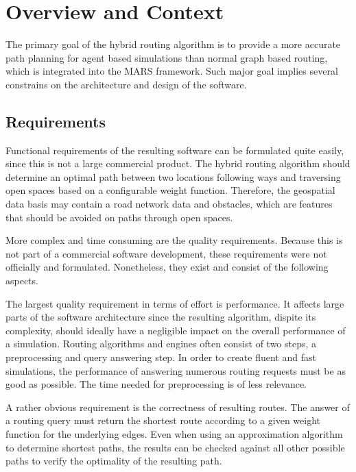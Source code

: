 
\section{Overview and Context}

	The primary goal of the hybrid routing algorithm is to provide a more accurate path planning for agent based simulations than normal graph based routing, which is integrated into the MARS framework.
	Such major goal implies several constrains on the architecture and design of the software.
	
	\subsection{Requirements}
	
		Functional requirements of the resulting software can be formulated quite easily, since this is not a large commercial product.
		The hybrid routing algorithm should determine an optimal path between two locations following ways and traversing open spaces based on a configurable weight function.
		Therefore, the geospatial data basis may contain a road network data and obstacles, which are features that should be avoided on paths through open spaces.
		
		More complex and time consuming are the quality requirements.
		Because this is not part of a commercial software development, these requirements were not officially and formulated.
		Nonetheless, they exist and consist of the following aspects.
	
		The largest quality requirement in terms of effort is performance.
		It affects large parts of the software architecture since the resulting algorithm, dispite its complexity, should ideally have a negligible impact on the overall performance of a simulation.
		Routing algorithms and engines often consist of two steps, a preprocessing and query answering step.
		In order to create fluent and fast simulations, the performance of answering numerous routing requests must be as good as possible.
		The time needed for preprocessing is of less relevance.
		
		A rather obvious requirement is the correctness of resulting routes.
		The answer of a routing query must return the shortest route according to a given weight function for the underlying edges.
		Even when using an approximation algorithm to determine shortest paths, the results can be checked against all other possible paths to verify the optimality of the resulting path.
		
